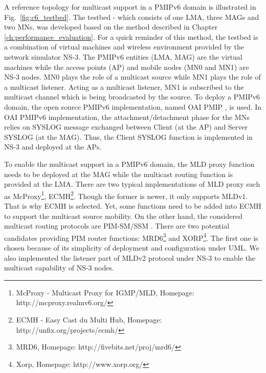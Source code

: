 A reference topology for multicast support in a PMIPv6 domain is illustrated in Fig.~\ref{fig:c6_testbed}. The testbed - which consists of one LMA, three MAGs and two MNs, was developed based on the method described in Chapter \ref{ch:performance_evaluation}. For a quick reminder of this method, the testbed is a combination of virtual machines and wireless environment provided by the network simulator NS-3. The PMIPv6 entities (LMA, MAG) are the virtual machines while the access points (AP) and mobile nodes (MN0 and MN1) are NS-3 nodes. MN0 plays the role of a multicast source while MN1 plays the role of a multicast listener. Acting as a multicast listener, MN1 is subscribed to the multicast channel which is being broadcasted by the source. To deploy a PMIPv6 domain, the open source PMIPv6 implementation, named OAI PMIP \cite{oai_pmip}, is used. In OAI PMIPv6 implementation, the attachment/detachment phase for the MNs relies on SYSLOG \cite{syslog} message exchanged between Client (at the AP) and Server SYSLOG (at the MAG). Thus, the Client SYSLOG function is implemented in NS-3 and deployed at the APs. 

To enable the multicast support in a PMIPv6 domain, the MLD proxy function needs to be deployed at the MAG while the multicast routing function is provided at the LMA. There are two typical implementations of MLD proxy such as McProxy\footnote{McProxy - Multicast Proxy for IGMP/MLD, Homepage: http://mcproxy.realmv6.org/}, ECMH\footnote{ECMH - Easy Cast du Multi Hub, Homepage: http://unfix.org/projects/ecmh/}. Though the former is newer, it only supports MLDv1. That is why ECMH is selected. Yet, some functions need to be added into ECMH to support the multicast source mobility. On the other hand, the considered multicast routing protocols are PIM-SM/SSM \cite{PIM_SM}. There are two potential candidates providing PIM router functions: MRD6\footnote{MRD6, Homepage: http://fivebits.net/proj/mrd6/} and XORP\footnote{Xorp, Homepage: http://www.xorp.org/}. The first one is chosen because of its simplicity of deployment and configuration under UML. We also implemented the listener part of MLDv2 protocol under NS-3 to enable the multicast capability of NS-3 nodes.

